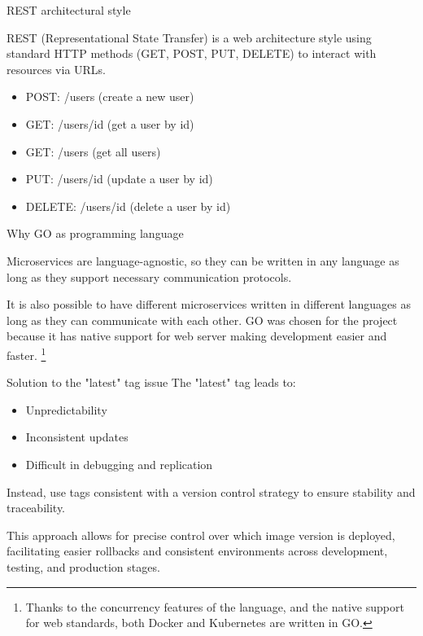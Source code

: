 \documentclass{beamer}
\begin{document}
\begin{frame}{REST architectural style}
	\begin{block}{}
		REST (Representational State Transfer) is a web architecture style using standard HTTP methods (GET, POST, PUT, DELETE) to interact with resources via URLs.
	\end{block}
	\begin{itemize}
		\item POST: /users (create a new user)
		\item GET: /users/{id} (get a user by id)
		\item GET: /users (get all users)
		\item PUT: /users/{id} (update a user by id)
		\item DELETE: /users/{id} (delete a user by id)
	\end{itemize}
	
	\label{rest}
\hyperlink{index_1}{}
\end{frame}

\begin{frame}{Why GO as programming language}
	\label{golang}
	\begin{block}{}
		Microservices are language-agnostic, so they can be written in any language as long as they support necessary communication protocols.
		\end{block}
		It is also possible to have different microservices written in different languages as long as they can communicate with each other.
		\newline \newline \newline
		GO was chosen for the project because it has native support for web server making development easier and faster.  \footnote{Thanks to the concurrency features of the language, and the native support for web standards, both Docker and Kubernetes are written in GO.}
\newline
\hyperlink{index_1}{}
\end{frame}

\begin{frame}{Solution to the "latest" tag issue}
	\label{latest_tag}
	The "latest" tag leads to:
	\begin{itemize}
		\item Unpredictability
		\item Inconsistent updates
		\item Difficult in debugging and replication
	\end{itemize}
	\begin{block}{}
		Instead, use tags consistent with a version control strategy to ensure stability and traceability.
	\end{block}
	This approach allows for precise control over which image version is deployed, facilitating easier rollbacks and consistent environments across development, testing, and production stages.
\hyperlink{index_1}{}
\end{frame}
\end{document}
